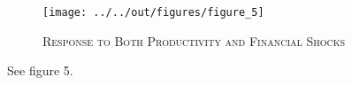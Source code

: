 \begin{figure}[ht]
    
    \centering

    \texttt{[image: ../../out/figures/figure\_5]}

    \caption{\textsc{Response to Both Productivity and Financial Shocks}}
    
    \label{fig:figure_5}

\end{figure}

See figure 5.